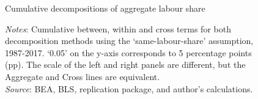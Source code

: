 \begin{figure}[h]
  \centering
\caption{\normalsize Cumulative decompositions of aggregate labour share}
\vfill
\begin{minipage}{\linewidth}
    \caption*{\textit{Notes}: Cumulative between, within and cross terms for both decomposition methods using the `same-labour-share' assumption, 1987-2017. `0.05' on the y-axis corresponds to 5 percentage points (pp). The scale of the left and right panels are different, but the Aggregate and Cross lines are equivalent. \\
    \textit{Source}: BEA, BLS, \citet{mendieta-munozDeclineUSLabor2021} replication package, and author's calculations.}
\end{minipage}
\label{fig:decomp_3}
\end{figure}

